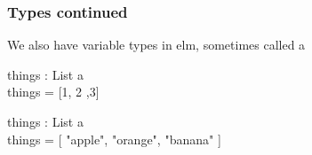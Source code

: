 \begin{frame}
        \frametitle{Types continued}
        We also have variable types in elm, sometimes called a
        \begin{example}
            things : List a\\
            things = [1, 2 ,3]
        \end{example}
        \begin{example}
            things : List a\\
            things = [ "apple", "orange", "banana" ]
        \end{example}
        
    \end{frame}
